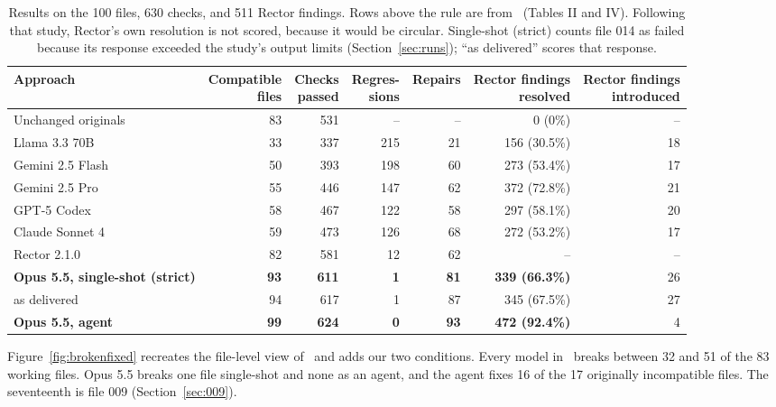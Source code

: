 \documentclass[11pt]{article}
\begin{document}
\begin{table}[t]
\centering\small
\caption{Results on the 100 files, 630 checks, and 511 Rector findings. Rows above the rule are from~\cite{mahmud2026modernization} (Tables II and IV). Following that study, Rector's own resolution is not scored, because it would be circular. Single-shot (strict) counts file 014 as failed because its response exceeded the study's output limits (Section~\ref{sec:runs}); ``as delivered'' scores that response.}
\label{tab:main}
\setlength{\tabcolsep}{3.2pt}\begin{tabular}{lrrrrrr}
\toprule
Approach & \shortstack{Compatible\\files} & \shortstack{Checks\\passed} & \shortstack{Regres-\\sions} & Repairs & \shortstack{Rector findings\\resolved} & \shortstack{Rector findings\\introduced} \\
\midrule
Unchanged originals & 83 & 531 & -- & -- & 0 (0\%) & -- \\
Llama 3.3 70B & 33 & 337 & 215 & 21 & 156 (30.5\%) & 18 \\
Gemini 2.5 Flash & 50 & 393 & 198 & 60 & 273 (53.4\%) & 17 \\
Gemini 2.5 Pro & 55 & 446 & 147 & 62 & 372 (72.8\%) & 21 \\
GPT-5 Codex & 58 & 467 & 122 & 58 & 297 (58.1\%) & 20 \\
Claude Sonnet 4 & 59 & 473 & 126 & 68 & 272 (53.2\%) & 17 \\
Rector 2.1.0 & 82 & 581 & 12 & 62 & -- & -- \\
\midrule
\textbf{Opus 5.5, single-shot (strict)} & \textbf{93} & \textbf{611} & \textbf{1} & \textbf{81} & \textbf{339 (66.3\%)} & 26 \\
\quad as delivered & 94 & 617 & 1 & 87 & 345 (67.5\%) & 27 \\
\textbf{Opus 5.5, agent} & \textbf{99} & \textbf{624} & \textbf{0} & \textbf{93} & \textbf{472 (92.4\%)} & 4 \\
\bottomrule
\end{tabular}
\end{table}

Figure~\ref{fig:brokenfixed} recreates the file-level view of~\cite{mahmud2026modernization} and adds our two conditions.
Every model in~\cite{mahmud2026modernization} breaks between 32 and 51 of the 83 working files.
Opus 5.5 breaks one file single-shot and none as an agent, and the agent fixes 16 of the 17 originally incompatible files.
The seventeenth is file 009 (Section~\ref{sec:009}).
\end{document}
